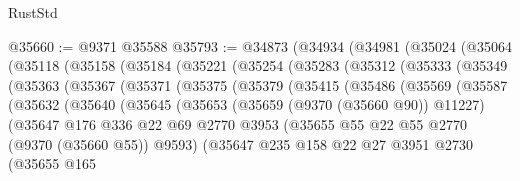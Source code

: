 \begin{lexlean}{RustStd}
\begin{coremodule}
@35660 := @9371 @35588
@35793 := @34873
    (@34934
      (@34981
        (@35024
          (@35064
            (@35118
              (@35158
                (@35184
                  (@35221
                    (@35254
                      (@35283
                        (@35312
                          (@35333
                            (@35349
                              (@35363
                                (@35367
                                  (@35371
                                    (@35375
                                      (@35379
                                        (@35415
                                          (@35486
                                            (@35569
                                              (@35587
                                                (@35632
                                                  (@35640
                                                    (@35645
                                                      (@35653
                                                        (@35659 (@9370 (@35660 @90)) @11227)
                                                        (@35647
                                                          @176
                                                          @336
                                                          @22
                                                          @69
                                                          @2770
                                                          @3953
                                                          (@35655
                                                            @55
                                                            @22
                                                            @55
                                                            @2770
                                                            (@9370 (@35660 @55))
                                                            @9593)
                                                          (@35647
                                                            @235
                                                            @158
                                                            @22
                                                            @27
                                                            @3951
                                                            @2730
                                                            (@35655
                                                              @165

\end{coremodule}
\end{lexlean}
